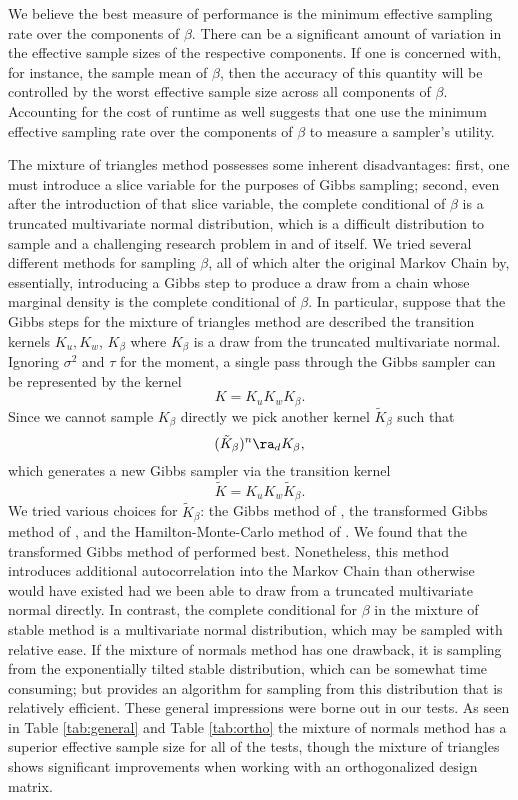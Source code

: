 \documentclass{article}
\begin{document}
We believe the best measure of performance is the minimum effective sampling
rate over the components of $\beta$.  There can be a significant amount of
variation in the effective sample sizes of the respective components.  If one is
concerned with, for instance, the sample mean of $\beta$, then the accuracy of
this quantity will be controlled by the worst effective sample size across all
components of $\beta$.  Accounting for the cost of runtime as well suggests that
one use the minimum effective sampling rate over the components of $\beta$ to
measure a sampler's utility.

The mixture of triangles method possesses some inherent disadvantages: first,
one must introduce a slice variable for the purposes of Gibbs sampling; second,
even after the introduction of that slice variable, the complete conditional of
$\beta$ is a truncated multivariate normal distribution, which is a difficult
distribution to sample and a challenging research problem in and of itself.  We
tried several different methods for sampling $\beta$, all of which alter the
original Markov Chain by, essentially, introducing a Gibbs step to produce a
draw from a chain whose marginal density is the complete conditional of $\beta$.
In particular, suppose that the Gibbs steps for the mixture of triangles method
are described the transition kernels $K_u, K_w$, $K_\beta$ where $K_\beta$ is a
draw from the truncated multivariate normal.  Ignoring $\sigma^2$ and $\tau$ for
the moment, a single pass through the Gibbs sampler can be represented by the
kernel
\[
K = K_u K_w K_\beta.
\]
Since we cannot sample $K_\beta$ directly we pick another kernel $\tilde
K_\beta$ such that
\[
 (\tilde K_\beta)^n \ra_d K_\beta,
\]
which generates a new Gibbs sampler via the transition kernel
\[
\tilde K = K_u K_w \tilde K_\beta.
\]
We tried various choices for $\tilde K_\beta$: the Gibbs method of
\cite{geweke-1991}, the transformed Gibbs method of
\cite{rodriguez-yam-etal-2004}, and the Hamilton-Monte-Carlo method of
\cite{pakman-paninski-2012}.  We found that the transformed Gibbs method of
\cite{rodriguez-yam-etal-2004} performed best.  Nonetheless, this method
introduces additional autocorrelation into the Markov Chain than otherwise would
have existed had we been able to draw from a truncated multivariate normal
directly.  In contrast, the complete conditional for $\beta$ in the mixture of
stable method is a multivariate normal distribution, which may be sampled with
relative ease.  If the mixture of normals method has one drawback, it is
sampling from the exponentially tilted stable distribution, which can be
somewhat time consuming; but \cite{devroye-2009} provides an algorithm for
sampling from this distribution that is relatively efficient.  These general
impressions were borne out in our tests.  As seen in Table \ref{tab:general} and
Table \ref{tab:ortho} the mixture of normals method has a superior effective
sample size for all of the tests, though the mixture of triangles shows
significant improvements when working with an orthogonalized design matrix.
\end{document}
